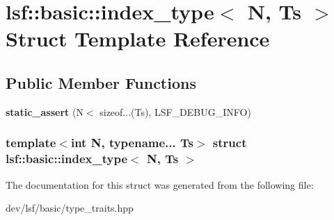 \hypertarget{structlsf_1_1basic_1_1index__type}{
\section{lsf::basic::index\_\-type$<$ N, Ts $>$ Struct Template Reference}
\label{structlsf_1_1basic_1_1index__type}
}
\subsection*{Public Member Functions}
\begin{DoxyCompactItemize}
\item 
\hypertarget{structlsf_1_1basic_1_1index__type_aabe14ee1791f8fc3c5212eacdeffa378}{
{\bfseries static\_\-assert} (N$<$ sizeof...(Ts), LSF\_\-DEBUG\_\-INFO)}
\label{structlsf_1_1basic_1_1index__type_aabe14ee1791f8fc3c5212eacdeffa378}

\end{DoxyCompactItemize}
\subsubsection*{template$<$int N, typename... Ts$>$ struct lsf::basic::index\_\-type$<$ N, Ts $>$}



The documentation for this struct was generated from the following file:\begin{DoxyCompactItemize}
\item 
dev/lsf/basic/type\_\-traits.hpp\end{DoxyCompactItemize}
